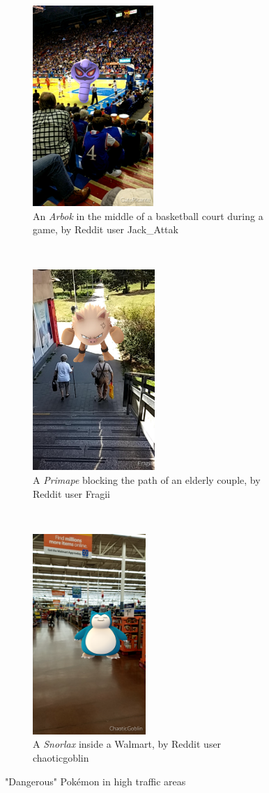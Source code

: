 \begin{figure}[h]
	\centering
	\begin{subfigure}[t]{0.3\textwidth}
		\includegraphics[height=3in]{Figures/pogo-arbok-basketball-Jack_Attak}
		\caption{An \emph{Arbok} in the middle of a basketball court during a game, by Reddit user Jack\_Attak}
	\end{subfigure}
	~
	\begin{subfigure}[t]{0.3\textwidth}
		\includegraphics[height=3in]{Figures/pogo-primeape-blocking-path-Fragii}
		\caption{A \emph{Primape} blocking the path of an elderly couple, by Reddit user Fragii}
	\end{subfigure}
	~
	\begin{subfigure}[t]{0.3\textwidth}
		\includegraphics[height=3in]{Figures/pogo-snorlax-walmart-chaoticgoblin}
		\caption{A \emph{Snorlax} inside a Walmart, by Reddit user chaoticgoblin}
	\end{subfigure}
	\caption{"Dangerous" Pokémon in high traffic areas}
\end{figure}

